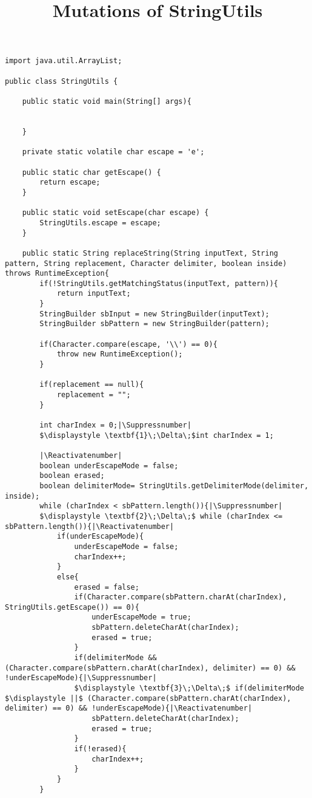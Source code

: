\documentclass{article}
\makeatletter
\let\origthelstnumber\thelstnumber
\newcommand*\Suppressnumber{%
  \lst@AddToHook{OnNewLine}{%
    \let\thelstnumber\relax%
     \advance\c@lstnumber-\@ne\relax%
    }%
}
\newcommand*\Reactivatenumber{%
  \lst@AddToHook{OnNewLine}{%
   \let\thelstnumber\origthelstnumber%
   \advance\c@lstnumber\@ne\relax}%
}
\makeatother
\begin{document}
\title{Mutations of StringUtils}
\date{}
\maketitle

\begin{lstlisting}
import java.util.ArrayList;

public class StringUtils {

    public static void main(String[] args){
	

    }

    private static volatile char escape = 'e';

    public static char getEscape() {
        return escape;
    }

    public static void setEscape(char escape) {
        StringUtils.escape = escape;
    }

    public static String replaceString(String inputText, String pattern, String replacement, Character delimiter, boolean inside) throws RuntimeException{
        if(!StringUtils.getMatchingStatus(inputText, pattern)){
            return inputText;
        }
        StringBuilder sbInput = new StringBuilder(inputText);
        StringBuilder sbPattern = new StringBuilder(pattern);

        if(Character.compare(escape, '\\') == 0){
            throw new RuntimeException();
        }

        if(replacement == null){
            replacement = "";
        }

        int charIndex = 0;|\Suppressnumber|
        $\displaystyle \textbf{1}\;\Delta\;$int charIndex = 1;
        
        |\Reactivatenumber|
        boolean underEscapeMode = false;
        boolean erased;
        boolean delimiterMode= StringUtils.getDelimiterMode(delimiter, inside);
        while (charIndex < sbPattern.length()){|\Suppressnumber|
        $\displaystyle \textbf{2}\;\Delta\;$ while (charIndex <= sbPattern.length()){|\Reactivatenumber|
            if(underEscapeMode){
                underEscapeMode = false;
                charIndex++;
            }
            else{
                erased = false;
                if(Character.compare(sbPattern.charAt(charIndex), StringUtils.getEscape()) == 0){
                    underEscapeMode = true;
                    sbPattern.deleteCharAt(charIndex);
                    erased = true;
                }
                if(delimiterMode && (Character.compare(sbPattern.charAt(charIndex), delimiter) == 0) && !underEscapeMode){|\Suppressnumber|
                $\displaystyle \textbf{3}\;\Delta\;$ if(delimiterMode $\displaystyle ||$ (Character.compare(sbPattern.charAt(charIndex), delimiter) == 0) && !underEscapeMode){|\Reactivatenumber|
                    sbPattern.deleteCharAt(charIndex);
                    erased = true;
                }
                if(!erased){
                    charIndex++;
                }
            }
        }


\end{lstlisting}
\end{document}

